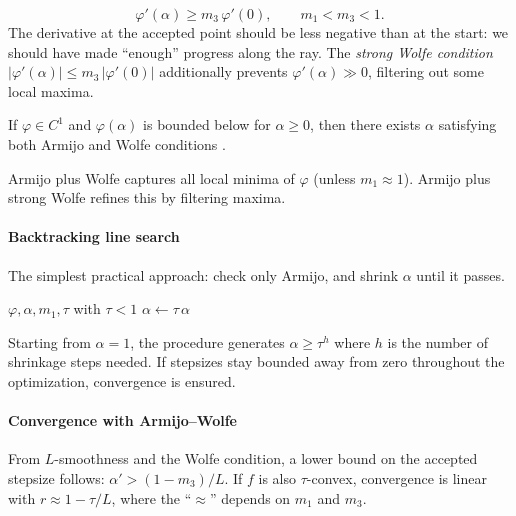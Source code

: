 \begin{equation}\label{eq:wolfe}
	\varphi'(\alpha) \geq m_3\, \varphi'(0),
	\qquad m_1 < m_3 < 1.
\end{equation}
The derivative at the accepted point should be less negative than at the start: we should have made ``enough'' progress along the ray.
The \emph{strong Wolfe condition} $|\varphi'(\alpha)| \leq m_3\, |\varphi'(0)|$ additionally prevents $\varphi'(\alpha) \gg 0$, filtering out some local maxima.

\begin{theorem}\label{thm:aw-exist}
	If $\varphi \in C^1$ and $\varphi(\alpha)$ is bounded below for $\alpha \geq 0$, then there exists $\alpha$ satisfying both Armijo and Wolfe conditions \cite{nocedal2006}.
\end{theorem}

Armijo plus Wolfe captures all local minima of $\varphi$ (unless $m_1 \approx 1$).
Armijo plus strong Wolfe refines this by filtering maxima.

\paragraph{Backtracking line search}

The simplest practical approach: check only Armijo, and shrink $\alpha$ until it passes.

\begin{algorithm}
	\caption{Backtracking Line Search (BLS)}
	\begin{algorithmic}[1]
		\Require $\varphi, \alpha, m_1, \tau$ with $\tau < 1$
				\State $\alpha \gets \tau\, \alpha$
			\EndWhile
		\EndProcedure
	\end{algorithmic}
\end{algorithm}

Starting from $\alpha = 1$, the procedure generates $\alpha \geq \tau^h$ where $h$ is the number of shrinkage steps needed.
If stepsizes stay bounded away from zero throughout the optimization, convergence is ensured.

\paragraph{Convergence with Armijo--Wolfe}

From $L$-smoothness and the Wolfe condition, a lower bound on the accepted stepsize follows: $\alpha' > (1 - m_3)/L$.
If $f$ is also $\tau$-convex, convergence is linear with $r \approx 1 - \tau/L$, where the ``$\approx$'' depends on $m_1$ and $m_3$.


